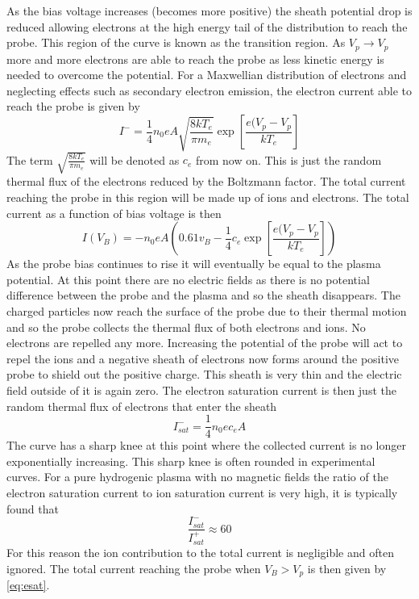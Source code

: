 \documentclass[12pt]{article}
\def\be{\begin{equation}}
\def\ee{\end{equation}}
\begin{document}
As the bias voltage increases (becomes more positive) the sheath potential drop is reduced allowing electrons at the high energy tail of the distribution to reach the probe. This region of the curve is known as the transition region. As $V_p \to V_{p}$ more and more electrons are able to reach the probe as less kinetic energy is needed to overcome the potential. For a Maxwellian distribution of electrons and neglecting effects such as secondary electron emission, the electron current able to reach the probe is given by 
\be  
I^{-} = \frac{1}{4} n_0 e A \sqrt{\frac{8 k T_e}{\pi m_e}}  \exp\left[\frac{e(V_p-V_{p}}{k T_e}\right]
\label{eq:ecurrent}
\ee
The term $\sqrt{\frac{8 k T_e}{\pi m_e}}$ will be denoted as $c_e$ from now on. This is just the random thermal flux of the electrons reduced by the Boltzmann factor. The total current reaching the probe in this region will be made up of ions and electrons. The total current as a function of bias voltage is then 
\be 
I(V_B) = - n_0 e A\left(0.61 v_B - \frac{1}{4}  c_e \exp\left[\frac{e(V_p-V_{p}}{k T_e}\right] \right)
\ee
As the probe bias continues to rise it will eventually be equal to the plasma potential. At this point there are no electric fields as there is no potential difference between the probe and the plasma and so the sheath disappears. The charged particles now reach the surface of the probe due to their thermal motion and so the probe collects the thermal flux of both electrons and ions. No electrons are repelled any more. Increasing the potential of the probe will act to repel the ions and a negative sheath of electrons now forms around the positive probe to shield out the positive charge. This sheath is very thin and the electric field outside of it is again zero. The electron saturation current is then just the random thermal flux of electrons that enter the sheath
\be  
I^{-}_{sat} = \frac{1}{4} n_0 e c_e A
\label{eq:esat}
\ee
The curve has a sharp knee at this point where the collected current is no longer exponentially increasing. This sharp knee is often rounded in experimental curves.
For a pure hydrogenic plasma with no magnetic fields the ratio of the electron saturation current to ion saturation current is very high, it is typically found that 
\be 
\frac{I^{-}_{sat}}{I^{+}_{sat}} \approx 60
\ee
For this reason the ion contribution to the total current is negligible and often ignored. The total current reaching the probe when $V_B > V_{p}$ is then given by \eqref{eq:esat}. %
\end{document}
